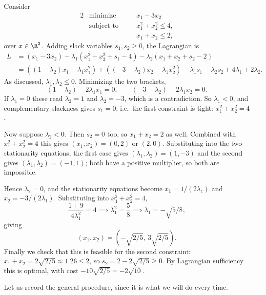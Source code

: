 \begin{example}
    Consider
    \begin{alignat*}{2}
        & \text{minimize} \quad && x_1 - 3x_2 \\
        & \text{subject to} \quad && x_1^2 + x_2^2 \leq 4, \\
        & && x_1 + x_2 \leq 2,
    \end{alignat*}
    over $x \in \R^2$. Adding slack variables $s_1, s_2 \geq 0$, the Lagrangian is
    \begin{align*}
        L &= (x_1 - 3x_2) - \lambda_1(x_1^2 + x_2^2 + s_1 - 4) - \lambda_2(x_1 + x_2 + s_2 - 2)\\
        &= \left((1 - \lambda_2)x_1 - \lambda_1x_1^2\right) + \left((-3 - \lambda_2)x_2 - \lambda_1 x_2^2\right) - \lambda_1 s_1 - \lambda_2 s_2 + 4\lambda_1 + 2\lambda_2.
    \end{align*}
    As discussed, $\lambda_1, \lambda_2 \leq 0$. Minimizing the two brackets,
    $$
    (1 - \lambda_2) - 2\lambda_1 x_1 = 0, \qquad (-3 - \lambda_2) - 2\lambda_1 x_2 = 0.
    $$
    If $\lambda_1 = 0$ these read $\lambda_2 = 1$ and $\lambda_2 = -3$, which is a contradiction. So $\lambda_1 < 0$, and complementary slackness gives $s_1 = 0$, i.e.\ the first constraint is tight: $x_1^2 + x_2^2 = 4$.

    Now suppose $\lambda_2 < 0$. Then $s_2 = 0$ too, so $x_1 + x_2 = 2$ as well. Combined with $x_1^2 + x_2^2 = 4$ this gives $(x_1, x_2) = (0,2)$ or $(2,0)$. Substituting into the two stationarity equations, the first case gives $(\lambda_1, \lambda_2) = (1, -3)$ and the second gives $(\lambda_1, \lambda_2) = (-1, 1)$; both have a positive multiplier, so both are impossible.

    Hence $\lambda_2 = 0$, and the stationarity equations become $x_1 = 1/(2\lambda_1)$ and $x_2 = -3/(2\lambda_1)$. Substituting into $x_1^2 + x_2^2 = 4$,
    $$
    \frac{1 + 9}{4\lambda_1^2} = 4 \implies \lambda_1^2 = \frac{5}{8} \implies \lambda_1 = -\sqrt{5/8},
    $$
    giving
    $$
    (x_1, x_2) = \left(-\sqrt{2/5},\ 3\sqrt{2/5}\right).
    $$
    Finally we check that this is feasible for the second constraint: $x_1 + x_2 = 2\sqrt{2/5} \approx 1.26 \leq 2$, so $s_2 = 2 - 2\sqrt{2/5} \geq 0$. By Lagrangian sufficiency this is optimal, with cost $-10\sqrt{2/5} = -2\sqrt{10}$.
\end{example}

Let us record the general procedure, since it is what we will do every time.


